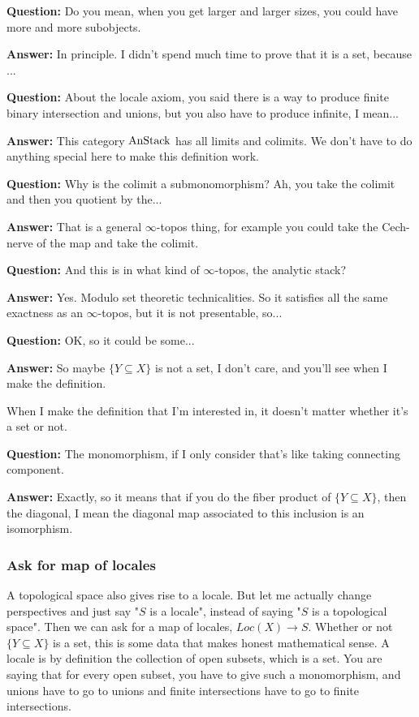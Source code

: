 \textbf{Question:} Do you mean, when you get larger and larger sizes, you could have more and more subobjects.

\textbf{Answer:} In principle. I didn't spend much time to prove that it is a set, because ...


\textbf{Question:} About the locale axiom, you said there is a way to produce finite binary intersection and unions, but you also have to produce infinite, I mean...

\textbf{Answer:} This category $\text{AnStack}$ has all limits and colimits. We don't have to do anything special here to make this definition work.

\textbf{Question:} Why is the colimit a submonomorphism? Ah, you take the colimit and then you quotient by the... 

\textbf{Answer:} That is a general $\infty$-topos thing, for example you could take the Cech-nerve of the map and take the colimit.


\textbf{Question:} And this is in what kind of $\infty$-topos, the analytic stack?

\textbf{Answer:} Yes. Modulo set theoretic technicalities. So it satisfies all the same exactness as an $\infty$-topos, but it is not presentable, so...

\textbf{Question:}  OK, so it could be some...

\textbf{Answer:} So maybe $\{ Y \subseteq X \}$ is not a set, I don't care, and you'll see when I make the definition.

When I make the definition that I'm interested in, it doesn't matter whether it's a set or not. 

\textbf{Question:} The monomorphism, if I only consider  that's like taking connecting component. 

\textbf{Answer:} Exactly, so it means that if you do the fiber product of  $\{ Y \subseteq X \}$, then the diagonal, I mean the diagonal map associated to this inclusion is an isomorphism.


\subsubsection{Ask for map of locales} \label{subsubsec:ask_for_map_of_locales}
A topological space also gives rise to a locale. But let me actually change perspectives and just say "$S$ is a locale", instead of saying "$S$ is a topological space". 
Then we can ask for a map of locales, $Loc(X) \to S$. Whether or not $\{ Y \subseteq X \} $ is a set, this is some data that makes honest mathematical sense. A locale is by definition the collection of open subsets, which is a set. You are saying that for every open subset, you have to give such a monomorphism, and  unions have to go to unions and finite intersections have to go to finite intersections.


